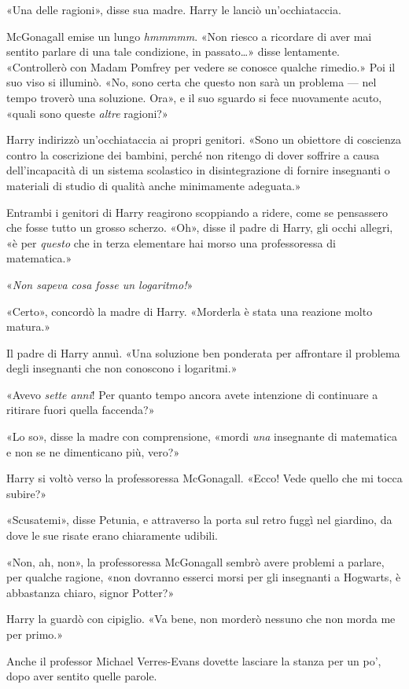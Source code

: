 «Una delle ragioni», disse sua madre. Harry le lanciò un’occhiataccia.

McGonagall emise un lungo \textit{hmmmmm}. «Non riesco a ricordare di aver mai sentito parlare di una tale condizione, in passato…» disse lentamente. «Controllerò con Madam Pomfrey per vedere se conosce qualche rimedio.» Poi il suo viso si illuminò. «No, sono certa che questo non sarà un problema — nel tempo troverò una soluzione. Ora», e il suo sguardo si fece nuovamente acuto, «quali sono queste \textit{altre} ragioni?»

Harry indirizzò un’occhiataccia ai propri genitori. «Sono un obiettore di coscienza contro la coscrizione dei bambini, perché non ritengo di dover soffrire a causa dell’incapacità di un sistema scolastico in disintegrazione di fornire insegnanti o materiali di studio di qualità anche minimamente adeguata.»

Entrambi i genitori di Harry reagirono scoppiando a ridere, come se pensassero che fosse tutto un grosso scherzo. «Oh», disse il padre di Harry, gli occhi allegri, «è per \textit{questo} che in terza elementare hai morso una professoressa di matematica.»

«\textit{Non sapeva cosa fosse un logaritmo!}»

«Certo», concordò la madre di Harry. «Morderla è stata una reazione molto matura.»

Il padre di Harry annuì. «Una soluzione ben ponderata per affrontare il problema degli insegnanti che non conoscono i logaritmi.»

«Avevo \textit{sette anni}! Per quanto tempo ancora avete intenzione di continuare a ritirare fuori quella faccenda?»

«Lo so», disse la madre con comprensione, «mordi \textit{una} insegnante di matematica e non se ne dimenticano più, vero?»

Harry si voltò verso la professoressa McGonagall. «Ecco! Vede quello che mi tocca subire?»

«Scusatemi», disse Petunia, e attraverso la porta sul retro fuggì nel giardino, da dove le sue risate erano chiaramente udibili.

«Non, ah, non», la professoressa McGonagall sembrò avere problemi a parlare, per qualche ragione, «non dovranno esserci morsi per gli insegnanti a Hogwarts, è abbastanza chiaro, signor Potter?»

Harry la guardò con cipiglio. «Va bene, non morderò nessuno che non morda me per primo.»

Anche il professor Michael Verres-Evans dovette lasciare la stanza per un po’, dopo aver sentito quelle parole.

